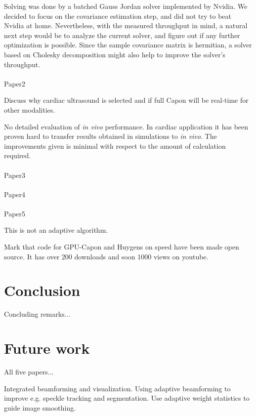 Solving was done by a batched Gauss Jordan solver implemented by Nvidia. We decided to focus on the covariance estimation step, and did not try to beat Nvidia at home. Nevertheless, with the measured throughput in mind, a natural next step would be to analyze the current solver, and figure out if any further optimization is possible. Since the sample covariance matrix is hermitian, a solver based on Cholesky decomposition might also help to improve the solver's throughput.
\\\\
Paper2

Discuss why cardiac ultrasound is selected and if full Capon will be real-time for other modalities.

No detailed evaluation of \textit{in vivo} performance. In cardiac application it has been proven hard to transfer results obtained in simulations to \textit{in vivo}. The improvements given is minimal with respect to the amount of calculation required.
\\\\
Paper3
\\\\
Paper4
\\\\
Paper5

This is not an adaptive algorithm.

Mark that code for GPU-Capon and Huygens on speed have been made open source.
It has over 200 downloads and soon 1000 views on youtube.

\section{Conclusion}

Concluding remarks...

\section{Future work}

All five papers...

Integrated beamforming and visualization. Using adaptive beamforming to improve e.g. speckle tracking and segmentation. Use adaptive weight statistics to guide image smoothing.

\endinput